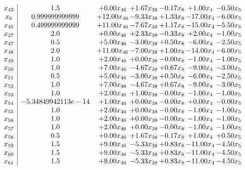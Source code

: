 \documentclass[8pt]{article}
\begin{document}
\[\begin{array}{c| c c@{\hskip 2pt} c@{\hskip 2pt} c@{\hskip 2pt} c@{\hskip 2pt} c@{\hskip 2pt} }
 x_{43}   &  1.5 & +  0.00 x_{46} & +  1.67 x_{38} & -0.17 x_{8} & +  1.00 x_{4} & -0.50 x_{5}\\
 x_{6}   &  0.999999999999 & + 12.00 x_{46} & -9.33 x_{38} & +  1.33 x_{8} & -17.00 x_{4} & -6.00 x_{5}\\
 x_{45}   &  0.499999999999 & + 11.00 x_{46} & -7.67 x_{38} & +  1.17 x_{8} & -15.00 x_{4} & -5.50 x_{5}\\
 x_{27}   &  2.0 & +  0.00 x_{46} & +  2.33 x_{38} & -0.33 x_{8} & +  2.00 x_{4} & -1.00 x_{5}\\
 x_{47}   &  0.5 & +  5.00 x_{46} & -3.00 x_{38} & +  0.50 x_{8} & -6.00 x_{4} & -2.50 x_{5}\\
 x_{48}   &  2.0 & + 11.00 x_{46} & -7.00 x_{38} & +  1.00 x_{8} & -14.00 x_{4} & -6.00 x_{5}\\
 x_{49}   &  1.0 & +  2.00 x_{46} & +  0.00 x_{38} & -0.00 x_{8} & -1.00 x_{4} & -1.00 x_{5}\\
 x_{50}   &  1.0 & +  7.00 x_{46} & -4.67 x_{38} & +  0.67 x_{8} & -9.00 x_{4} & -3.00 x_{5}\\
 x_{51}   &  0.5 & +  5.00 x_{46} & -3.00 x_{38} & +  0.50 x_{8} & -6.00 x_{4} & -2.50 x_{5}\\
 x_{52}   &  1.0 & +  7.00 x_{46} & -4.67 x_{38} & +  0.67 x_{8} & -9.00 x_{4} & -3.00 x_{5}\\
 x_{53}   &  1.0 & +  2.00 x_{46} & +  1.00 x_{38} & -0.00 x_{8} & -1.00 x_{4} & -1.00 x_{5}\\
 x_{54}   &  -5.34849942113e-14 & +  1.00 x_{46} & +  0.00 x_{38} & -0.00 x_{8} & +  0.00 x_{4} & -0.00 x_{5}\\
 x_{55}   &  1.0 & +  2.00 x_{46} & +  0.00 x_{38} & -0.00 x_{8} & -1.00 x_{4} & -1.00 x_{5}\\
 x_{56}   &  1.0 & +  2.00 x_{46} & +  0.00 x_{38} & -0.00 x_{8} & -1.00 x_{4} & -1.00 x_{5}\\
 x_{57}   &  1.0 & +  2.00 x_{46} & +  0.00 x_{38} & -0.00 x_{8} & -1.00 x_{4} & -1.00 x_{5}\\
 x_{58}   &  0.5 & +  0.00 x_{46} & +  1.67 x_{38} & -0.17 x_{8} & +  1.00 x_{4} & +  0.50 x_{5}\\
 x_{59}   &  1.5 & +  9.00 x_{46} & -5.33 x_{38} & +  0.83 x_{8} & -11.00 x_{4} & -4.50 x_{5}\\
 x_{60}   &  1.5 & +  9.00 x_{46} & -5.33 x_{38} & +  0.83 x_{8} & -11.00 x_{4} & -4.50 x_{5}\\
 x_{61}   &  1.5 & +  9.00 x_{46} & -5.33 x_{38} & +  0.83 x_{8} & -11.00 x_{4} & -4.50 x_{5}\\

\end{array}\]
\end{document}
